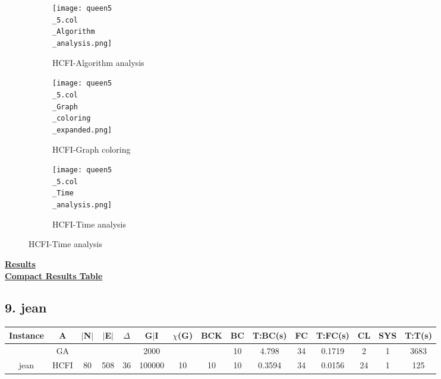 \documentclass[10pt]{article}
\begin{document}
\graphicspath{{./Core1/Solutions/HCFI/queen5\_5.col}}
\begin{figure}[H]
\begin{subfigure}{.33\textwidth}
  \centering
  \texttt{[image: queen5\\\_5.col\\\_Algorithm\\\_analysis.png]}
  \caption{HCFI-Algorithm analysis}
   \label{fig:subfig1}
\end{subfigure}%
\begin{subfigure}{.33\textwidth}
  \centering
  \texttt{[image: queen5\\\_5.col\\\_Graph\\\_coloring\\\_expanded.png]}
  \caption{HCFI-Graph coloring}
  \label{fig:subfig2}
\end{subfigure}
\begin{subfigure}{.33\textwidth}
  \centering
  \texttt{[image: queen5\\\_5.col\\\_Time\\\_analysis.png]}
  \caption{HCFI-Time analysis}
  \end{subfigure}
\end{figure}
\vspace{2cm}
\begin{center}
\hyperlink{page.8}{\textbf{Results}}\\
\vspace{0.5cm}
\hyperlink{page.71}{\textbf{Compact Results Table}}
\end{center}
\pagebreak
\subsection*{\hspace{0,9073976cm} 9. jean}
\begin{table}[H]
\centering
\begin{tabular}{|c|c|c|c|c|c|c|c|c|c|c|c|c|c|c|}
\hline
Instance& A &$|$N$|$ & $|$E$|$ & $\Delta$ & G$|$I & $\chi$(G) &BCK&BC & T:BC(s) & FC & T:FC(s) & CL & SYS & T:T(s) \\ \hline \hline
 &GA&       &                   &                     &2000         &     \cellcolor{yellow} & {\cellcolor{yellow}}& {{\cellcolor{green}10}}
&4.798   &34        & 0.1719                  &2                    &1          &3683         \\ \cline{2-2} \cline{6-6} \cline{9-15}
 \multirow{-2}{*}{jean} &HCFI   &\multirow{-2}{*}{80}   &\multirow{-2}{*}{508}     &\multirow{-2}{*}{36}     &100000     &\multirow{-2}{*}{\cellcolor{yellow}10}      & \multirow{-2}{*}{\cellcolor{yellow}10}    &{\cellcolor{green}10}     &0.3594         &34    &0.0156         &24    &1     & 125       \\ \hline 
\end{tabular}
\end{table}
\end{document}
